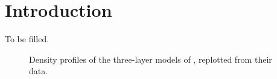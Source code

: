 
\section{Introduction}\label{sec:intro}
To be filled.

\begin{figure}[tb!]
\centering
{}
\caption{Density profiles of the three-layer models of \citet{Nettelmann2013b},
replotted from their data.}
\label{fig:N13_profs}
\end{figure}
